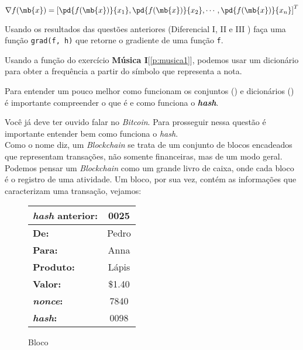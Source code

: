 	$$\nabla f(\mb{x}) = \left[
	\pd{f(\mb{x})}{x_1},
	\pd{f(\mb{x})}{x_2},
	\cdots,
	\pd{f(\mb{x})}{x_n}
	\right]^{T}$$
	
	\quest Usando os resultados das questões anteriores (Diferencial I, II e III ) faça uma função \texttt{grad(f, h)} que retorne o gradiente de uma função \texttt{f}.
	
	
	
	
	
	
	
	
	
	Usando a função do exercício \textbf{Música I}[\ref{p:musica1}], podemos usar um dicionário para obter a frequência a partir do símbolo que representa a nota.


	\begin{interlude}{ \incomplete \label{i:hash}}
		
	Para entender um pouco melhor como funcionam os conjuntos () e dicionários () é importante compreender o que é e como funciona o \textit{\textbf{hash}}.
	
	
	
	\end{interlude}	
	
	\label{p:blockchain}
	
	Você já deve ter ouvido falar no \textit{Bitcoin}. Para prosseguir nessa questão é importante entender bem como funciona o \textit{hash}.\\
	
	Como o nome diz, um \textit{Blockchain} se trata de um conjunto de blocos encadeados que representam transações, não somente financeiras, mas de um modo geral. Podemos pensar um \textit{Blockchain} como um grande livro de caixa, onde cada bloco é o registro de uma atividade. Um bloco, por sua vez, contém as informações que caracterizam uma transação, vejamos:
	
	\begin{figure}[H]
		\centering
		\begin{tabular}{|lc|}
		\hline
		\textbf{\textit{hash} anterior:} & 0025\\
		\hline
		\textbf{De:} & Pedro \\
		\hline
		\textbf{Para:} & Anna \\
		\hline
		\textbf{Produto:} & Lápis \\
		\hline	
		\textbf{Valor:} & \$1.40 \\
		\hline
		\textbf{\textit{nonce}:} & 7840 \\
		\hline
		\textbf{\textit{hash}:} & 0098  \\
		\hline
		\end{tabular}
		\label{fig:blockchain}
		\caption{Bloco}
	\end{figure}
	

